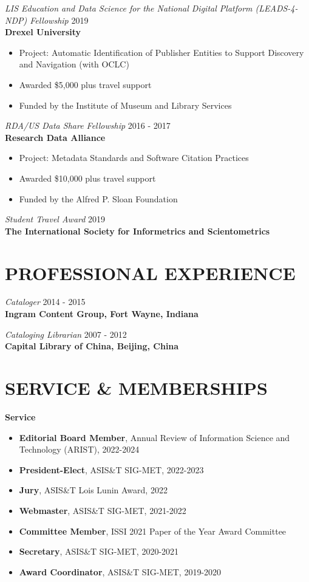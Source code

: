 \documentclass[margin, 10pt]{res} %
\begin{document}
\begin{resume}
{\sl LIS Education and Data Science for the National Digital Platform (LEADS-4-NDP) Fellowship}  \hfill 2019 \\
\textbf{Drexel University}
\begin{itemize}
\item Project: Automatic Identification of Publisher Entities to Support Discovery and Navigation (with OCLC)
\item Awarded \$5,000 plus travel support
\item Funded by the Institute of Museum and Library Services
\end{itemize} 

{\sl RDA/US Data Share Fellowship}  \hfill 2016 - 2017 \\
\textbf{Research Data Alliance}
\begin{itemize}
\item Project: Metadata Standards and Software Citation Practices
\item Awarded \$10,000 plus travel support
\item Funded by the Alfred P. Sloan Foundation
\end{itemize} 

{\sl Student Travel Award} \hfill 2019 \\
\textbf{The International Society for Informetrics and Scientometrics}

\section{PROFESSIONAL EXPERIENCE}

\textit{Cataloger} \hfill 2014 - 2015\\
\textbf{Ingram Content Group, Fort Wayne, Indiana}

\textit{Cataloging Librarian} \hfill 2007 - 2012\\
\textbf{Capital Library of China, Beijing, China}

\section{SERVICE \& MEMBERSHIPS}

\textbf{Service}
\begin{itemize}
\item \textbf{Editorial Board Member}, Annual Review of Information Science and Technology (ARIST), 2022-2024
\item \textbf{President-Elect}, ASIS\&T SIG-MET, 2022-2023
\item \textbf{Jury}, ASIS\&T Lois Lunin Award, 2022
\item \textbf{Webmaster}, ASIS\&T SIG-MET, 2021-2022
\item \textbf{Committee Member}, ISSI 2021 Paper of the Year Award Committee
\item \textbf{Secretary}, ASIS\&T SIG-MET, 2020-2021
\item \textbf{Award Coordinator}, ASIS\&T SIG-MET, 2019-2020
\end{itemize}


\end{resume}
\end{document}
